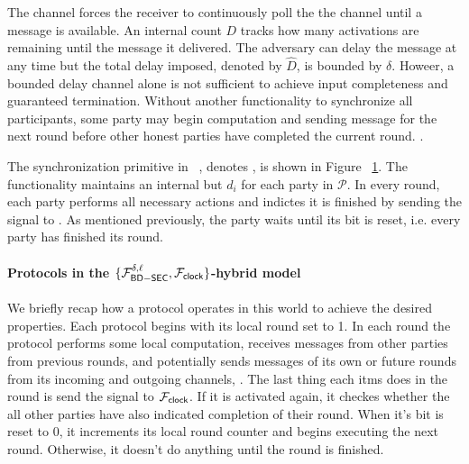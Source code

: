 The channel forces the receiver to continuously poll the the channel until a message is available.
An internal count $D$ tracks how many activations are remaining until the message it delivered.
The adversary can delay the message at any time but the total delay imposed, denoted by $\hat{D}$, is bounded by $\delta$.
Howeer, a bounded delay channel alone is not sufficient to achieve input completeness and guaranteed termination.
Without another functionality to synchronize all participants, some party may begin computation and sending message for the next round before other honest parties have completed the current round.
.

The synchronization primitive in ~\cite{katz-clock}, denotes \Fclock, is shown in Figure ~\ref{fig:functionality:clock}.
The functionality maintains an internal but $d_i$ for each party in $\mathcal{P}$. 
In every round, each party performs all necessary actions and indictes it is finished by sending the  signal to \Fclock.
As mentioned previously, the party waits until its bit is reset, i.e. every party has finished its round.

\begin{figure}
	
	\label{fig:functionality:clock}
\end{figure}

\paragraph{Protocols in the $\{\mathcal{F}_{{\mathsf {BD-SEC}}}^{\delta,\ell}, \mathcal{F}_{{\mathsf {clock}}}\}$-hybrid model} 
We briefly recap how a protocol operates in this world to achieve the desired properties.
Each protocol begins with its local round set to 1.
In each round the protocol performs some local computation, receives messages from other parties from previous rounds, and potentially sends messages of its own or future rounds from its incoming and outgoing channels, \Fbdsec.
The last thing each itms does in the round is send the  signal to $\mathcal{F}_{{\mathsf {clock}}}$.
If it is activated again, it checkes whether the all other parties have also indicated completion of their round.
When it's bit is reset to 0, it increments its local round counter and begins executing the next round.
Otherwise, it doesn't do anything until the round is finished.
